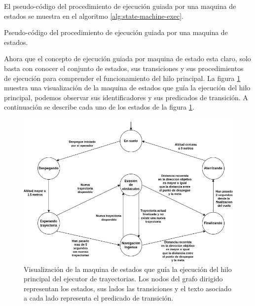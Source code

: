 El pseudo-código del procedimiento de ejecución guiada por una maquina de estados se muestra en el algoritmo \ref{alg:state-machine-exec}.

\begin{algorithm}
\caption{Pseudo-código del procedimiento de ejecución guiada por una maquina de estados. }
\label{alg:state-machine-exec}


\end{algorithm}

Ahora que el concepto de ejecución guiada por maquina de estado esta claro, solo basta con conocer el conjunto de estados, sus transiciones y sus procedimientos de ejecución para comprender el funcionamiento del hilo principal. La figura \ref{fig:state-machine} muestra una visualización de la maquina de estados que guía la ejecución del hilo principal, podemos observar sus identificadores y sus predicados de transición. A continuación se describe cada uno de los estados de la figura \ref{fig:state-machine}. 

\begin{figure}[H]
    \centering
    \includegraphics[scale=0.54]{partes/img/State Machine.jpg}
    \caption[Visualización de la maquina de estados que guía la ejecución del hilo principal del ejecutor de trayectorias.]{Visualización de la maquina de estados que guía la ejecución del hilo principal del ejecutor de trayectorias. Los nodos del grafo dirigido representan los estados, sus lados las transiciones y el texto asociado a cada lado representa el predicado de transición.}
    \label{fig:state-machine}
\end{figure}

